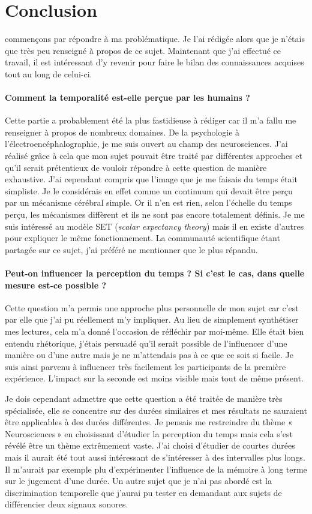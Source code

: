 \documentclass[12pt,fleqn,oneside,french,openany]{book} %
\begin{document}
\section{Conclusion} \label{sec:conclusion} commençons par répondre à ma problématique. Je l'ai rédigée alors que je n'étais que très peu renseigné à propos de ce sujet. Maintenant que j'ai effectué ce travail, il est intéressant d'y revenir pour faire le bilan des connaissances acquises tout au long de celui-ci.

\paragraph{Comment la temporalité est-elle perçue par les humains ?}
Cette partie a probablement été la plus fastidieuse à rédiger car il m'a fallu me renseigner à propos de nombreux domaines. De la psychologie à l'électroencéphalographie, je me suis ouvert au champ des neurosciences. J'ai réalisé grâce à cela que mon sujet pouvait être traité par différentes approches et qu'il serait prétentieux de vouloir répondre à cette question de manière exhaustive. J'ai cependant compris que l'image que je me faisais du temps était simpliste. Je le considérais en effet comme un continuum qui devait être perçu par un mécanisme cérébral simple. Or il n'en est rien, selon l'échelle du temps perçu, les mécanismes diffèrent et ils ne sont pas encore totalement définis. Je me suis intéressé au modèle SET (\emph{scalar expectancy theory}) mais il en existe d'autres pour expliquer le même fonctionnement. La communauté scientifique étant partagée sur ce sujet, j'ai préféré ne mentionner que le plus répandu.

\paragraph{Peut-on influencer la perception du temps ? Si c'est le cas, dans quelle mesure est-ce possible ?}
Cette question m'a permis une approche plus personnelle de mon sujet car c'est par elle que j'ai pu réellement m'y impliquer. Au lieu de simplement synthétiser mes lectures, cela m'a donné l'occasion de réfléchir par moi-même. Elle était bien entendu rhétorique, j'étais persuadé qu'il serait possible de l'influencer d'une manière ou d'une autre mais je ne m'attendais pas à ce que ce soit si facile. Je suis ainsi parvenu à influencer très facilement les participants de la première expérience. L'impact sur la seconde est moins visible mais tout de même présent.

Je dois cependant admettre que cette question a été traitée de manière très spécialisée, elle se concentre sur des durées similaires et mes résultats ne sauraient être applicables à des durées différentes. Je pensais me restreindre du thème «\,Neurosciences\,» en choisissant d'étudier la perception du temps mais cela s'est révélé être un thème extrêmement vaste. J'ai choisi d'étudier de courtes durées mais il aurait été tout aussi intéressant de s'intéresser à des intervalles plus longs. Il m'aurait par exemple plu d'expérimenter l'influence de la mémoire à long terme sur le jugement d'une durée. Un autre sujet que je n'ai pas abordé est la discrimination temporelle que j'aurai pu tester en demandant aux sujets de différencier deux signaux sonores.
\end{document}
